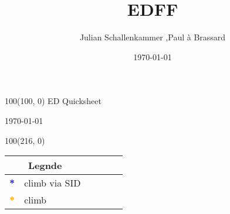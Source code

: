 \documentclass[10pt,landscape,a4paper]{article}
\title{EDFF}
\author{Julian Schallenkammer ,Paul à Brassard}
\date{\today}
\begin{document}
\setlength\extrarowheight{1pt}

\setlength{\TPHorizModule}{1mm}
\setlength{\TPVertModule}{\TPHorizModule}
\textblockorigin{7mm}{12mm}


\begin{textblock}{100}(100, 0)
  \large
  \centering
  ED Quicksheet

  \today
\end{textblock}

\begin{textblock}{100}(216, 0)
\begin{table}[]
\begin{tabular}{|llllll}
\multicolumn{2}{c}{\textbf{Legnde}} \\ \hline
\multicolumn{1}{|l|}{\textbf{\textcolor{blue}{*}}} 							& \multicolumn{1}{c|}{climb via SID} 		\\ \hline
\multicolumn{1}{|l|}{\textbf{\textcolor{orange}{*}}}						& \multicolumn{1}{l|}{climb }			\\ \hline

\end{tabular}
\end{table}
\end{textblock}
\end{document}
